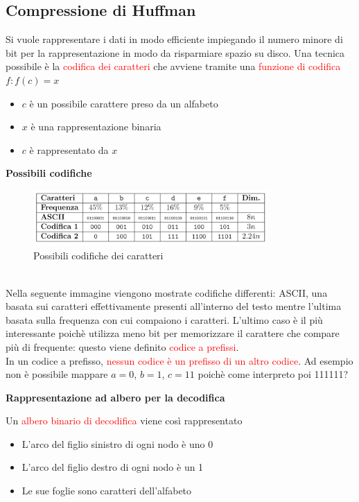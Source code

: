 \documentclass[../cheatSheetAlgoritmi.tex]{subfiles}
\begin{document}
\subsection{Compressione di Huffman}
Si vuole rappresentare i dati in modo efficiente impiegando il numero minore di bit per la rappresentazione in modo da risparmiare spazio su disco. Una tecnica possibile è la \textcolor{red}{codifica dei caratteri} che avviene tramite una \textcolor{red}{funzione di codifica} $f : f(c) = x$
\begin{itemize}
	\item $c$ è un possibile carattere preso da un alfabeto
	\item $x$ è una rappresentazione binaria
	\item $c$ è rappresentato da $x$
\end{itemize}
\textbf{Possibili codifiche}
\begin{figure}[h]
\centering
\includegraphics[width=0.8\textwidth]{../img/Greedy_1.jpg}
\caption{Possibili codifiche dei caratteri}
\end{figure} \\
Nella seguente immagine viengono mostrate codifiche differenti: ASCII, una basata sui caratteri effettivamente presenti all'interno del testo mentre l'ultima basata sulla frequenza con cui compaiono i caratteri. L'ultimo caso è il più interessante poichè utilizza meno bit per memorizzare il carattere che compare più di frequente: questo viene definito \textcolor{red}{codice a prefissi}.\\
In un codice a prefisso, \textcolor{red}{nessun codice è un prefisso di un altro codice}. Ad esempio non è possibile mappare $a = 0$, $b = 1$, $c = 11$ poichè come interpreto poi 111111?
\newpage
\begin{flushleft}
\textbf{Rappresentazione ad albero per la decodifica}
\end{flushleft}
Un \textcolor{red}{albero binario di decodifica} viene così rappresentato
\begin{itemize}
	\item L'arco del figlio sinistro di ogni nodo è uno 0
	\item L'arco del figlio destro di ogni nodo è un 1
	\item Le sue foglie sono caratteri dell'alfabeto
\end{itemize}
\end{document}
